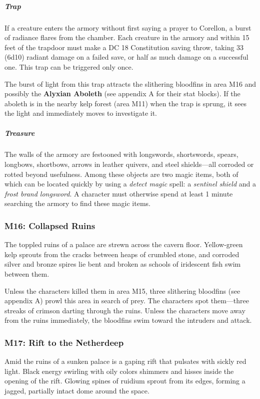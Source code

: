 \documentclass[10pt,a4paper,twoside,fancy,bg=print,twocolumn,openany,nodeprecatedcode]{dndbook}
\begin{document}
\subparagraph{Trap}
If a creature enters the armory without first saying a prayer to Corellon, a burst of radiance flares from the chamber. Each creature in the armory and within 15 feet of the trapdoor must make a DC 18 Constitution saving throw, taking 33 (6d10) radiant damage on a failed save, or half as much damage on a successful one. This trap can be triggered only once.

The burst of light from this trap attracts the slithering bloodfins in area M16 and possibly the \textbf{Alyxian Aboleth} (see appendix A for their stat blocks). If the aboleth is in the nearby kelp forest (area M11) when the trap is sprung, it sees the light and immediately moves to investigate it.

\subparagraph{Treasure}
The walls of the armory are festooned with longswords, shortswords, spears, longbows, shortbows, arrows in leather quivers, and steel shields—all corroded or rotted beyond usefulness. Among these objects are two magic items, both of which can be located quickly by using a \textit{detect magic} spell: a \textit{sentinel shield} and a \textit{frost brand longsword}. A character must otherwise spend at least 1 minute searching the armory to find these magic items.

\subsubsection{M16: Collapsed Ruins}
\begin{DndReadAloud}{}
The toppled ruins of a palace are strewn across the cavern floor. Yellow-green kelp sprouts from the cracks between heaps of crumbled stone, and corroded silver and bronze spires lie bent and broken as schools of iridescent fish swim between them.

\end{DndReadAloud}

Unless the characters killed them in area M15, three slithering bloodfins (see appendix A) prowl this area in search of prey. The characters spot them—three streaks of crimson darting through the ruins. Unless the characters move away from the ruins immediately, the bloodfins swim toward the intruders and attack.

\subsubsection{M17: Rift to the Netherdeep}
\begin{DndReadAloud}{}
Amid the ruins of a sunken palace is a gaping rift that pulsates with sickly red light. Black energy swirling with oily colors shimmers and hisses inside the opening of the rift. Glowing spines of ruidium sprout from its edges, forming a jagged, partially intact dome around the space.

\end{DndReadAloud}
\end{document}

